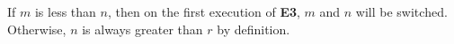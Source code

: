 If $m$ is less than $n$, then on the first execution of \textbf{E3}, $m$ and $n$ will be switched.
Otherwise, $n$ is always greater than $r$ by definition.